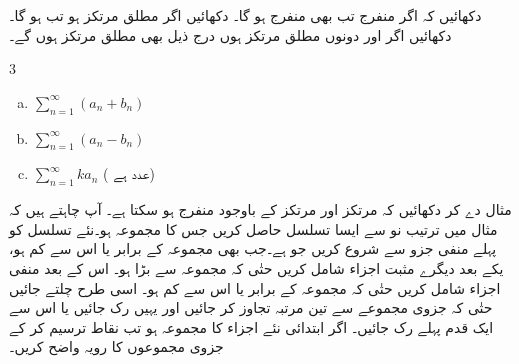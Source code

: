 دکھائیں کہ اگر  منفرج تب  بھی منفرج ہو گا۔
دکھائیں اگر  مطلق مرتکز ہو تب  ہو گا۔
دکھائیں اگر  اور  دونوں مطلق مرتکز ہوں درج ذیل بھی مطلق مرتکز ہوں گے۔
\begin{multicols}{3}
\begin{enumerate}[a.]
\item
$\sum_{n=1}^{\infty}(a_n+b_n)$
\item
$\sum_{n=1}^{\infty}(a_n-b_n)$
\item
$\sum_{n=1}^{\infty}ka_n$\quad
( عدد ہے)
\end{enumerate}
\end{multicols}
مثال دے کر دکھائیں کہ مرتکز  اور مرتکز  کے باوجود 
 منفرج ہو سکتا ہے۔
آپ چاہتے ہیں کہ مثال  میں ترتیب نو سے ایسا تسلسل حاصل کریں جس کا مجموعہ  ہو۔نئے تسلسل کو پہلے منفی جزو سے شروع کریں جو    ہے۔جب بھی مجموعہ  کے برابر یا اس سے کم ہو، یکے بعد دیگرے مثبت اجزاء  شامل کریں حتٰی کہ مجموعہ  سے بڑا ہو۔ اس کے بعد منفی اجزاء شامل کریں حتٰی کہ مجموعہ  کے برابر یا اس سے کم ہو۔ اسی طرح چلتے جائیں حتٰی کہ جزوی مجموعے   سے تین مرتبہ تجاوز کر جائیں اور یہیں رک جائیں یا اس سے ایک قدم پہلے رک جائیں۔ اگر ابتدائی  نئے اجزاء کا مجموعہ  ہو تب نقاط   ترسیم کر کے جزوی مجموعوں  کا رویہ واضح کریں۔
\\
